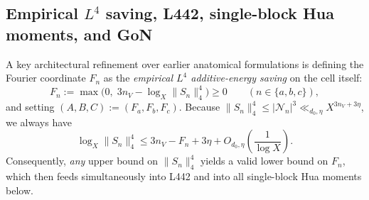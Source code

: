 \documentclass[11pt,a4paper]{amsart}
\theoremstyle{plain}
\theoremstyle{definition}
\theoremstyle{remark}
\begin{document}
\subsection{Empirical \texorpdfstring{$L^4$}{L4} saving, \textsf{L442}, single-block Hua moments, and \textsf{GoN}}

A key architectural refinement over earlier anatomical formulations is defining the Fourier coordinate $F_n$ as the \emph{empirical $L^4$ additive-energy saving} on the cell itself:
\begin{equation}\label{eq:F_empirical}
  F_n := \max\!\bigl(0,\; 3 n_V - \log_X \|S_n\|_4^4\bigr) \ge 0 \qquad (n \in \{a,b,c\}),
\end{equation}
and setting $(A, B, C) := (F_a, F_b, F_c)$. Because $\|S_n\|_4^4 \le |\mathcal{N}_n|^3 \ll_{d_0,\eta} X^{3 n_V + 3\eta}$, we always have
\begin{equation}\label{eq:L4_by_F}
  \log_X \|S_n\|_4^4 \le 3 n_V - F_n + 3\eta + O_{d_0,\eta}\!\left(\frac{1}{\log X}\right).
\end{equation}
Consequently, \emph{any} upper bound on $\|S_n\|_4^4$ yields a valid lower bound on $F_n$, which then feeds simultaneously into \textsf{L442} and into all single-block Hua moments below.
\end{document}
